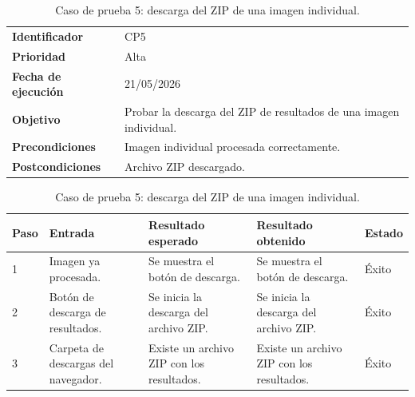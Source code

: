 \begin{table}[]
	\centering
	\footnotesize
	\renewcommand{\arraystretch}{1.2}
	\begin{tabularx}{\textwidth}{p{3.2cm} X}
		\toprule
		\textbf{Identificador} & CP5 \\
		\textbf{Prioridad} & Alta \\
		\textbf{Fecha de ejecución} & 21/05/2026 \\
		\textbf{Objetivo} & Probar la descarga del ZIP de resultados de una imagen individual. \\
		\textbf{Precondiciones} & Imagen individual procesada correctamente. \\
		\textbf{Postcondiciones} & Archivo ZIP descargado. \\
		\midrule
	\end{tabularx}
	\begin{tabularx}{\textwidth}{p{0.8cm} p{3.2cm} X X p{1.3cm}}
		\textbf{Paso} & \textbf{Entrada} & \textbf{Resultado esperado} & \textbf{Resultado obtenido} & \textbf{Estado} \\
		\midrule
		1 & Imagen ya procesada. & Se muestra el botón de descarga. & Se muestra el botón de descarga. & Éxito \\
		2 & Botón de descarga de resultados. & Se inicia la descarga del archivo ZIP. & Se inicia la descarga del archivo ZIP. & Éxito \\
		3 & Carpeta de descargas del navegador. & Existe un archivo ZIP con los resultados. & Existe un archivo ZIP con los resultados. & Éxito \\
		\bottomrule
	\end{tabularx}
	\caption{Caso de prueba 5: descarga del ZIP de una imagen individual.}
	\label{tab:cp5}
\end{table}


